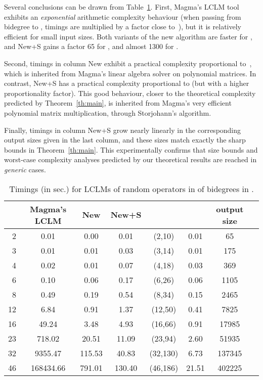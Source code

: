 \documentclass{sig-alt-full}
\begin{document}
Several conclusions can be drawn from
Table~\ref{tab:Magma-lclms}. First, Magma's LCLM tool exhibits an
\emph{exponential\/} arithmetic complexity behaviour (when passing from
bidegree  to , timings are multiplied by a factor close
to~), but it is relatively efficient for small input sizes. Both variants
of the new algorithm are faster for , and {\sf New+S} gains a factor
65 for , and almost 1300 for .

Second, timings in column {\sf New} exhibit a practical complexity
proportional to~, which is inherited from Magma's linear algebra solver
on polynomial matrices. In contrast, {\sf New+S} has a practical complexity
proportional to  (but with a higher proportionality factor). This
good behaviour, closer to the theoretical complexity 
predicted by Theorem~\ref{th:main}, is inherited from Magma's very efficient
polynomial matrix multiplication, through Storjohann's algorithm.

Finally, timings in column {\sf New+S} grow nearly linearly in the
corresponding output sizes given in the last column, and these sizes match
exactly the sharp bounds in Theorem~\ref{th:main}. This experimentally
confirms that size bounds and worst-case complexity analyses predicted by our
theoretical results 
are reached in \emph{generic\/} cases.

\begin{table}[t]
\begin{scriptsize}
\begin{center}
\begin{tabular}{r|ccccccc}
 & \sf Magma's LCLM & \sf New &  \sf New+S & & & \sf output size \\
\hline
 2 & 0.01 & 0.00 & 0.01 & (2,10) & 0.01 & 65 &  \\
 3 & 0.01 & 0.01 & 0.03 & (3,14) & 0.01 & 175 &  \\
 4 & 0.02 & 0.01 & 0.07 & (4,18) & 0.03 & 369 &  \\
 6 & 0.10 & 0.06 & 0.17 & (6,26) & 0.06 & 1105 &  \\
 8 & 0.49 & 0.19 & 0.54 & (8,34) & 0.15 & 2465 &  \\
12 & 6.84 & 0.91 & 1.37 & (12,50) & 0.41 & 7825 &  \\
16 & 49.24 & 3.48 & 4.93 & (16,66) & 0.91 & 17985 &  \\
23 & 718.02 & 20.51 & 11.09 & (23,94) & 2.60 & 51935 &  \\
32 & 9355.47 & 115.53 & 40.83 & (32,130) & 6.73 & 137345 &  \\ 
46 & 168434.66 & 791.01 & 130.40 & (46,186) &  21.51 & 402225 \\
\end{tabular}
\end{center}
\end{scriptsize}
\vskip-12pt
\begin{small}
\caption{Timings (in sec.) for LCLMs of  random operators in  of bidegrees  in . }\label{tab:Magma-lclms} 
\end{small}
\end{table}
\end{document}
